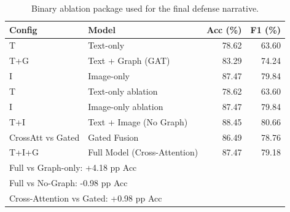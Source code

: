 \begin{table}[t]
\centering
\caption{Binary ablation package used for the final defense narrative.}
\label{tab:ablation-definitive}
\begin{tabular}{llrr}
\hline
\textbf{Config} & \textbf{Model} & \textbf{Acc (\%)} & \textbf{F1 (\%)} \\
\hline
T & Text-only & 78.62 & 63.60 \\
T+G & Text + Graph (GAT) & 83.29 & 74.24 \\
I & Image-only & 87.47 & 79.84 \\
T & Text-only ablation & 78.62 & 63.60 \\
I & Image-only ablation & 87.47 & 79.84 \\
T+I & Text + Image (No Graph) & 88.45 & 80.66 \\
CrossAtt vs Gated & Gated Fusion & 86.49 & 78.76 \\
T+I+G & Full Model (Cross-Attention) & 87.47 & 79.18 \\
\hline
\multicolumn{4}{l}{Full vs Graph-only: +4.18 pp Acc} \\
\multicolumn{4}{l}{Full vs No-Graph: -0.98 pp Acc} \\
\multicolumn{4}{l}{Cross-Attention vs Gated: +0.98 pp Acc} \\
\hline
\end{tabular}
\end{table}
